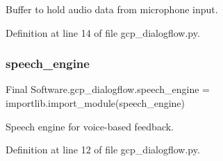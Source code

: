 Buffer to hold audio data from microphone input. 



Definition at line 14 of file gcp\+\_\+dialogflow.\+py.

\mbox{\label{namespace_final_01_software_1_1gcp__dialogflow_aca077f7dada1e4a915b5cc26dcc24163}} 
\subsubsection{speech\_engine}
{\footnotesize\ttfamily Final Software.\+gcp\+\_\+dialogflow.\+speech\+\_\+engine = importlib.\+import\+\_\+module(\textquotesingle{}speech\+\_\+engine\textquotesingle{})}



Speech engine for voice-\/based feedback. 



Definition at line 12 of file gcp\+\_\+dialogflow.\+py.

